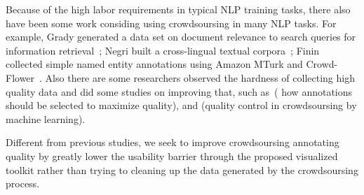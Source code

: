 Because of the high labor requirements in typical NLP training tasks,
there also have been some work considing using crowdsoursing in many
NLP tasks. For example, Grady \etal generated a data set on document
relevance to search queries for information
retrieval~\cite{Grady2010CDR18666961866723}; Negri \etal built a
cross-lingual textual corpora~\cite{Negri2011DCC21454322145510};
Finin \etal collected simple named entity annotations using Amazon MTurk
and Crowd-Flower~\cite{Finin2010ANE18666961866709}. Also there are
some researchers observed the hardness of collecting high quality data
and did some studies on improving that, such
as~\cite{Hsueh2009DQC15641311564137}( how annotations should be
selected to maximize quality), and \cite{lease2011quality} (quality
control in crowdsoursing by machine learning).

Different from previous studies, we seek to improve crowdsoursing
annotating quality by greatly lower the usability barrier through the
proposed visualized toolkit rather than trying to cleaning up the data
generated by the crowdsoursing process. 
